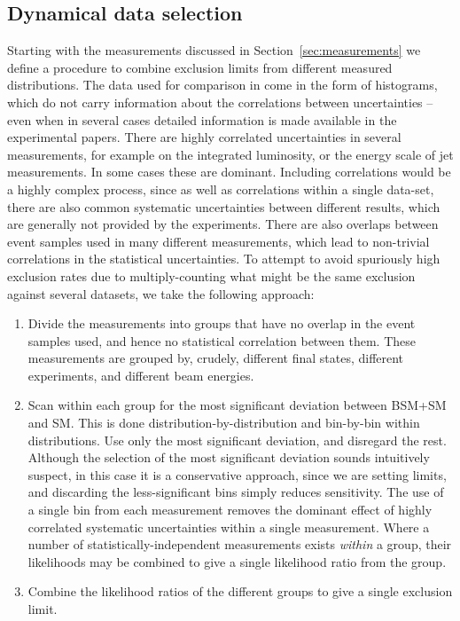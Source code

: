 \documentclass[floatfix]{article}
\begin{document}
\subsection{Dynamical data selection}\label{sec:dynselec}
\label{sec:selec}

Starting with the measurements discussed in Section~\ref{sec:measurements} 
we define a procedure to combine exclusion limits from different measured distributions.
The data used for comparison in \rivet come in the form of histograms, which do not carry information about the correlations between uncertainties -- 
even when in several cases detailed information is made available in the experimental papers. There are highly correlated uncertainties in several measurements, 
for example on the integrated luminosity, or the energy scale of jet measurements. In some cases these are dominant. Including correlations would be a highly 
complex process, since as well as correlations within a single data-set, there are also common systematic uncertainties between different
results, which are generally not provided by the experiments. There are also overlaps between event samples used in many different measurements, which lead to
non-trivial correlations in the statistical uncertainties. To attempt to avoid spuriously high exclusion rates due to multiply-counting what might be the 
same exclusion against several datasets, we take the following approach:
\begin{enumerate}
\item Divide the measurements into groups that have no overlap in the event samples used, and hence no statistical correlation 
between them. These measurements are grouped by, crudely, different final states, different experiments, and different beam 
energies.
\item Scan within each group for the most significant deviation between BSM+SM and SM. This is done distribution-by-distribution and bin-by-bin within distributions.
Use only the most significant deviation, and disregard the rest. Although the selection of the most significant deviation sounds intuitively suspect, in this case it
is a conservative approach, since we are setting limits, and discarding the less-significant bins simply reduces sensitivity. 
The use of a single bin from each measurement removes the dominant effect of highly correlated 
systematic uncertainties within a single measurement. Where a number
of statistically-independent measurements exists {\it within} a group, their likelihoods may be combined to give a single likelihood ratio from the group.
\item Combine the likelihood ratios of the different groups to give a single exclusion limit.
\end{enumerate}
\end{document}
